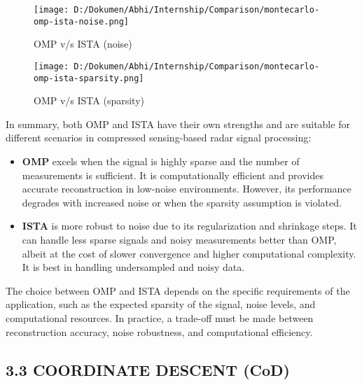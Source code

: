\documentclass[
  letterpaper,
  DIV=11,
  numbers=noendperiod]{scrartcl}
\begin{document}
\begin{figure}[H]

{\centering \texttt{[image: D:/Dokumen/Abhi/Internship/Comparison/montecarlo-omp-ista-noise.png]}

}

\caption{OMP v/s ISTA (noise)}

\end{figure}%

\begin{figure}[H]

{\centering \texttt{[image: D:/Dokumen/Abhi/Internship/Comparison/montecarlo-omp-ista-sparsity.png]}

}

\caption{OMP v/s ISTA (sparsity)}

\end{figure}%

In summary, both OMP and ISTA have their own strengths and are suitable
for different scenarios in compressed sensing-based radar signal
processing:

\begin{itemize}
\item
  \textbf{OMP} excels when the signal is highly sparse and the number of
  measurements is sufficient. It is computationally efficient and
  provides accurate reconstruction in low-noise environments. However,
  its performance degrades with increased noise or when the sparsity
  assumption is violated.
\item
  \textbf{ISTA} is more robust to noise due to its regularization and
  shrinkage steps. It can handle less sparse signals and noisy
  measurements better than OMP, albeit at the cost of slower convergence
  and higher computational complexity. It is best in handling
  undersampled and noisy data.
\end{itemize}

The choice between OMP and ISTA depends on the specific requirements of
the application, such as the expected sparsity of the signal, noise
levels, and computational resources. In practice, a trade-off must be
made between reconstruction accuracy, noise robustness, and
computational efficiency.

\subsection{3.3 COORDINATE DESCENT (CoD)}\label{coordinate-descent-cod}
\end{document}
